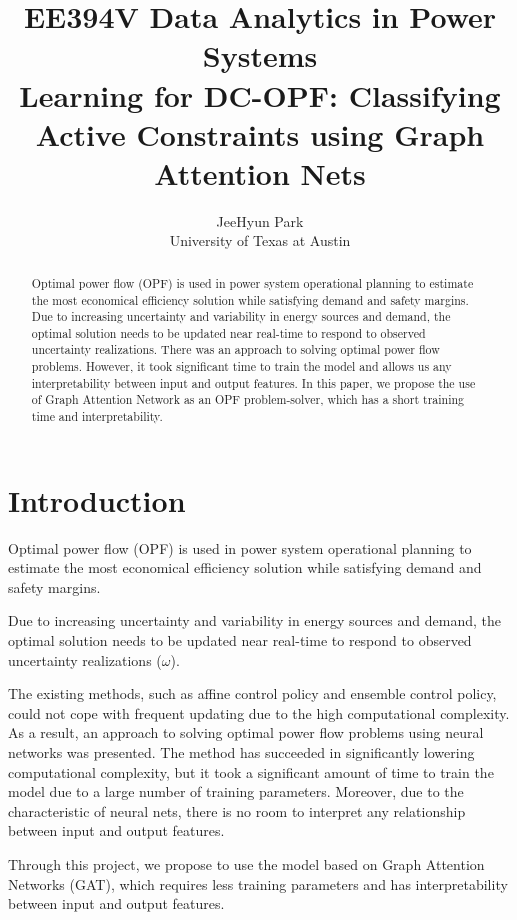 \documentclass [11pt]{article}
\title{\textbf{EE394V Data Analytics in Power Systems\\\medskip Learning for DC-OPF: Classifying Active Constraints using Graph Attention Nets}}
\author{JeeHyun Park\\University of Texas at Austin}
\begin{document}
\maketitle
\nocite{*}


\begin{abstract}
Optimal power flow (OPF) is used in power system operational planning to estimate the most economical efficiency solution while satisfying demand and safety margins. 
Due to increasing uncertainty and variability in energy sources and demand, the optimal solution needs to be updated near real-time to respond to observed uncertainty realizations. 
There was an approach to solving optimal power flow problems. However, it took significant time to train the model and allows us any interpretability between input and output features. 
In this paper, we propose the use of Graph Attention Network as an OPF problem-solver, which has a short training time and interpretability.

\end{abstract}


\section{Introduction}

Optimal power flow (OPF) is used in power system operational planning to estimate the most economical efficiency solution while satisfying demand and safety margins.

Due to increasing uncertainty and variability in energy sources and demand, the optimal solution needs to be updated near real-time to respond to observed uncertainty realizations ($\omega$).

The existing methods, such as affine control policy and ensemble control policy, could not cope with frequent updating due to the high computational complexity. As a result, an approach to solving optimal power flow problems using neural networks \cite{DC_OPF_NNs} was presented. 
The method has succeeded in significantly lowering computational complexity, but it took a significant amount of time to train the model due to a large number of training parameters. Moreover, due to the characteristic of neural nets, there is no room to interpret any relationship between input and output features. 

Through this project, we propose to use the model based on Graph Attention Networks (GAT)\cite{GAT}, which requires less training parameters and has interpretability between input and output features.
\end{document}
